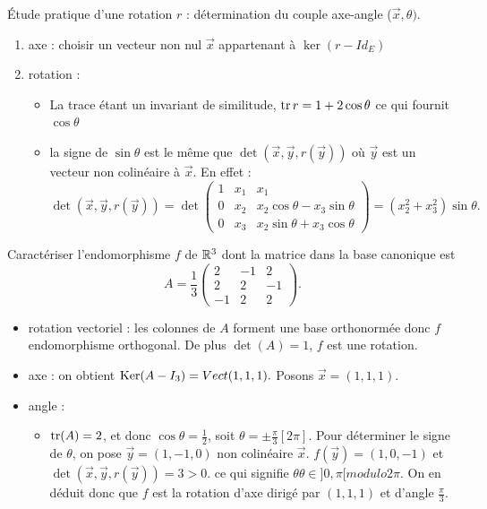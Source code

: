 \documentclass{book}
\begin{document}
Étude pratique d'une rotation $r$ : détermination du couple axe-angle ($\vec{x},\theta)$.
\begin{enumerate}
\item axe : choisir un vecteur non nul $\vec{x}$ appartenant à $\ker (r-Id_E)$
\item rotation :
\begin{itemize}
\item La trace étant un invariant de similitude, $\operatorname{tr}
r
= 1+2\cos \theta$ ce qui fournit $\cos \theta$
\item la signe de $\sin \theta$ est le même que $\det (\vec{x},\vec{y},r(\vec{y}))$  où
$\vec{y}$ est un vecteur non colinéaire à $\vec{x}$.  En
effet : $\det (\vec{x},\vec{y},r(\vec{y})) =\det \begin{pmatrix}
1 & x_1& x_1\\
0 & x_2 & x_2\cos \theta - x_3\sin \theta\\
0 & x_3 &  x_2\sin \theta + x_3\cos \theta
\end{pmatrix}=(x_2^2+x_3^2)\sin \theta.$ 
\end{itemize} 
\end{enumerate}
\begin{Exemple}
Caractériser l'endomorphisme $f$ de $\mathbb{R}^3$ dont la matrice dans la base canonique est
$$A= \frac 1 3 \begin{pmatrix}
2&-1&2\\
2&2&-1\\
-1&2&2
\end{pmatrix}.$$
\begin{itemize}
\item rotation vectoriel : les colonnes de $A$ forment une base orthonormée donc $f$ endomorphisme orthogonal. De plus  $\det(A)=1$, $f$ est  une rotation.
\item axe :  on obtient $\operatorname{Ker}(A-I_3)=Vect(1,1,1).$ Posons $\vec{x}=(1,1,1)$. 
\item angle :
\begin{itemize}
\item  $\operatorname{tr}(A)=2$, et donc $\cos \theta =\frac 1 2$, soit $\theta=\pm \frac \pi 3[2\pi]$. Pour déterminer le signe de $\theta$, on pose $\vec{y}=(1,-1,0)$ non colinéaire  $\vec{x}$. $f(\vec{y})=(1,0,-1)$ et $\det (\vec{x},\vec{y},r(\vec{y}))=3>0$. ce qui signifie $\theta\theta\in]0,\pi[ modulo 2\pi.$ On en déduit donc que $f$ est la rotation d'axe dirigé par $(1,1,1)$ et d'angle $\frac \pi 3$.
\end{itemize}
\end{itemize}
\end{Exemple}
\end{document}
